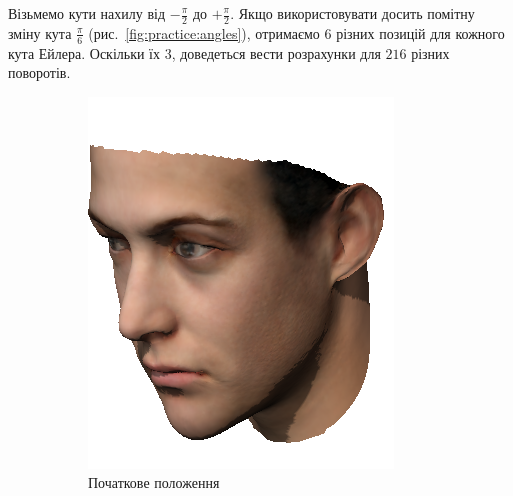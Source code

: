 Візьмемо кути нахилу від $-\frac{\pi}{2}$ до $+\frac{\pi}{2}$.
Якщо використовувати досить помітну зміну кута $\frac{\pi}{6}$
(рис.~\ref{fig:practice:angles}),
отримаємо $6$ різних позицій для кожного кута Ейлера.
Оскільки їх $3$, доведеться вести розрахунки для $216$ різних поворотів.
\begin{figure}[h]
  \centering
  \begin{subfigure}[b]{0.3\textwidth}
    \centering
    \includegraphics[width=\textwidth]{images/face_rotated_1}
    \caption{Початкове положення}
  \end{subfigure}
  \begin{subfigure}[b]{0.3\textwidth}
    \centering

\end{subfigure}
\end{figure}
